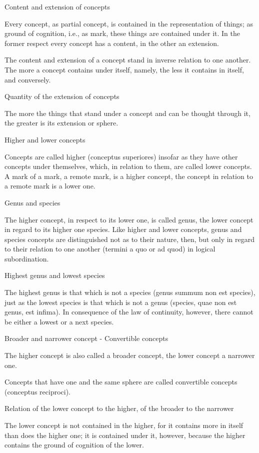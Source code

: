 Content and extension of concepts

Every concept, as partial concept, is contained in
the representation of things;
as ground of cognition, i.e., as mark,
these things are contained under it.
In the former respect every concept has a content,
in the other an extension.

The content and extension of a concept
stand in inverse relation to one another.
The more a concept contains under itself, namely,
the less it contains in itself, and conversely.

Quantity of the extension of concepts

The more the things that stand under a concept
and can be thought through it,
the greater is its extension or sphere.

Higher and lower concepts

Concepts are called higher (conceptus superiores) insofar as
they have other concepts under themselves,
which, in relation to them, are called lower concepts.
A mark of a mark, a remote mark, is a higher concept,
the concept in relation to a remote mark is a lower one.

Genus and species

The higher concept, in respect to its lower one, is called genus,
the lower concept in regard to its higher one species.
Like higher and lower concepts, genus and species concepts are
distinguished not as to their nature, then,
but only in regard to their relation to one another
(termini a quo or ad quod) in logical subordination.

Highest genus and lowest species

The highest genus is that which is not a species
(genus summum non est species),
just as the lowest species is that which is not a genus
(species, quae non est genus, est infima).
In consequence of the law of continuity, however,
there cannot be either a lowest or a next species.

Broader and narrower concept - Convertible concepts

The higher concept is also called a broader concept,
the lower concept a narrower one.

Concepts that have one and the same sphere are called convertible concepts
(conceptus reciproci).

Relation of the lower concept to the higher,
of the broader to the narrower

The lower concept is not contained in the higher,
for it contains more in itself than does the higher one;
it is contained under it, however,
because the higher contains the ground of cognition of the lower.

